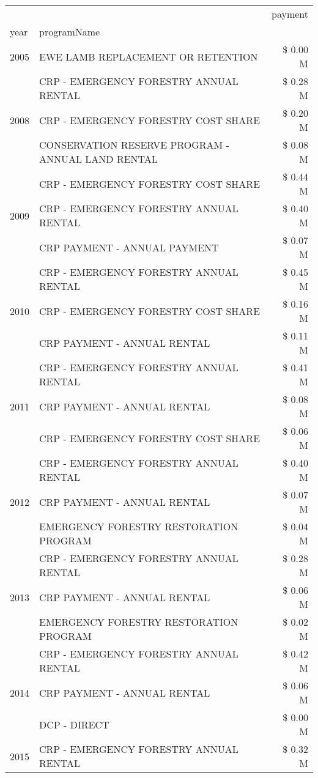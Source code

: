 \begin{tabular}{llr}
\toprule
 &  & payment \\
year & programName &  \\
\midrule
2005 & EWE LAMB REPLACEMENT OR RETENTION & \$ 0.00 M \\
\cline{1-3}
\multirow[t]{3}{*}{2008} & CRP - EMERGENCY FORESTRY ANNUAL RENTAL & \$ 0.28 M \\
 & CRP - EMERGENCY FORESTRY COST SHARE & \$ 0.20 M \\
 & CONSERVATION RESERVE PROGRAM - ANNUAL LAND RENTAL & \$ 0.08 M \\
\cline{1-3}
\multirow[t]{3}{*}{2009} & CRP - EMERGENCY FORESTRY COST SHARE & \$ 0.44 M \\
 & CRP - EMERGENCY FORESTRY ANNUAL RENTAL & \$ 0.40 M \\
 & CRP PAYMENT - ANNUAL PAYMENT & \$ 0.07 M \\
\cline{1-3}
\multirow[t]{3}{*}{2010} & CRP - EMERGENCY FORESTRY ANNUAL RENTAL & \$ 0.45 M \\
 & CRP - EMERGENCY FORESTRY COST SHARE & \$ 0.16 M \\
 & CRP PAYMENT - ANNUAL RENTAL & \$ 0.11 M \\
\cline{1-3}
\multirow[t]{3}{*}{2011} & CRP - EMERGENCY FORESTRY ANNUAL RENTAL & \$ 0.41 M \\
 & CRP PAYMENT - ANNUAL RENTAL & \$ 0.08 M \\
 & CRP - EMERGENCY FORESTRY COST SHARE & \$ 0.06 M \\
\cline{1-3}
\multirow[t]{3}{*}{2012} & CRP - EMERGENCY FORESTRY ANNUAL RENTAL & \$ 0.40 M \\
 & CRP PAYMENT - ANNUAL RENTAL & \$ 0.07 M \\
 & EMERGENCY FORESTRY RESTORATION PROGRAM & \$ 0.04 M \\
\cline{1-3}
\multirow[t]{3}{*}{2013} & CRP - EMERGENCY FORESTRY ANNUAL RENTAL & \$ 0.28 M \\
 & CRP PAYMENT - ANNUAL RENTAL & \$ 0.06 M \\
 & EMERGENCY FORESTRY RESTORATION PROGRAM & \$ 0.02 M \\
\cline{1-3}
\multirow[t]{3}{*}{2014} & CRP - EMERGENCY FORESTRY ANNUAL RENTAL & \$ 0.42 M \\
 & CRP PAYMENT - ANNUAL RENTAL & \$ 0.06 M \\
 & DCP - DIRECT & \$ 0.00 M \\
\cline{1-3}
\multirow[t]{3}{*}{2015} & CRP - EMERGENCY FORESTRY ANNUAL RENTAL & \$ 0.32 M \\

\end{tabular}

